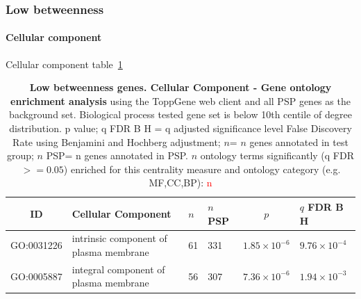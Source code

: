 \clearpage

\subsubsection{Low betweenness}

\paragraph{Cellular component}

Cellular component table~\ref{tab:ToppGENE GO: Cellular Component. bet 10 centile cwpsp.txtp = p value; q FDR B H = q adjusted significance level False Discovery Rate using Benjamini and Hochberg adjustment; n= n genes annotated in test group; n PSP= n genes annotated in PSP}


\begin{table}[ht]
\centering
\begin{adjustbox}{width=\textwidth}
\setlength{\extrarowheight}{2pt}
\begin{tabular}{@{}clllcl@{}}
  \toprule
  ID & Cellular Component & $n$ & $n$ PSP & $p$ & $q$ FDR B H \\ 

  \midrule
GO:0031226 & intrinsic component of plasma membrane & 61 & 331 & $1.85 \times 10^{-6}$ & $9.76 \times 10^{-4}$ \\ 
  GO:0005887 & integral component of plasma membrane & 56 & 307 & $7.36 \times 10^{-6}$ & $1.94 \times 10^{-3}$ \\ 
   \bottomrule
\end{tabular}
\end{adjustbox}
\caption[Gene ontology enrichment Low betweenness genes Cellular Component of genes below 10th centile of distribution]{\textbf{Low betweenness genes. Cellular Component - Gene ontology enrichment analysis} using the ToppGene web client and all PSP genes as the background set.  Biological process tested gene set is below 10th centile of degree distribution.  p value; q FDR B H = q adjusted significance level False Discovery Rate using Benjamini and Hochberg adjustment; $n$= $n$ genes annotated in test group; $n$ PSP= n genes annotated in PSP. $n$ ontology terms significantly (q FDR$>=0.05$) enriched for this centrality measure and ontology category (e.g. MF,CC,BP): \textcolor{red}{n}}
\label{tab:ToppGENE GO: Cellular Component. bet 10 centile cwpsp.txtp = p value; q FDR B H = q adjusted significance level False Discovery Rate using Benjamini and Hochberg adjustment; n= n genes annotated in test group; n PSP= n genes annotated in PSP}
\end{table}

